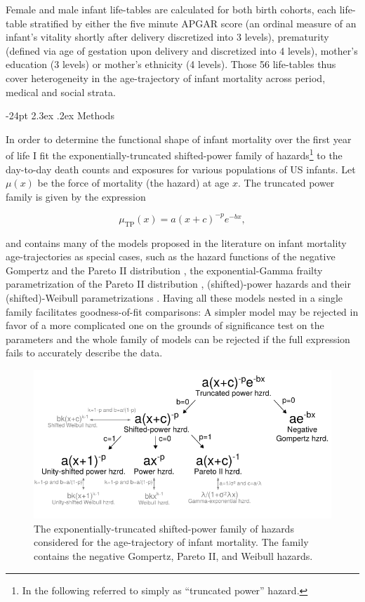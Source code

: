 \documentclass[10pt, twoside, parskip=half]{article}
\makeatletter
\def\maxwidth{\ifdim\Gin@nat@width>\linewidth\linewidth
  \else\Gin@nat@width\fi}
\let\Oldincludegraphics\includegraphics
\renewcommand{\includegraphics}[1]{\Oldincludegraphics[width=\maxwidth]{#1}}
\renewcommand\section{\@startsection {section}{1}{\z@}%
                                   {-24pt}%
                                   {2.3ex \@plus.2ex}%
                                   {\normalfont\large\bfseries}}
\makeatother
\begin{document}
Female and male infant life-tables are calculated for both birth
cohorts, each life-table stratified by either the five minute APGAR
score (an ordinal measure of an infant's vitality shortly after delivery
discretized into 3 levels), prematurity (defined via age of gestation
upon delivery and discretized into 4 levels), mother's education (3
levels) or mother's ethnicity (4 levels). Those 56 life-tables thus
cover heterogeneity in the age-trajectory of infant mortality across
period, medical and social strata.

\section{Methods}\label{methods}

In order to determine the functional shape of infant mortality over the
first year of life I fit the exponentially-truncated shifted-power
family of hazards\footnote{In the following referred to simply as
  ``truncated power'' hazard.} to the day-to-day death counts and
exposures for various populations of US infants. Let \(\mu(x)\) be the
force of mortality (the hazard) at age \(x\). The truncated power family
is given by the expression

\[
\mu_\text{TP}(x) = a(x+c)^{-p}e^{-bx},
\]

and contains many of the models proposed in the literature on infant
mortality age-trajectories as special cases, such as the hazard
functions of the negative Gompertz
\citep[pp.~368]{Lomax1954, Marshall2007} and the Pareto II distribution
\citep[pp.~400]{Lomax1954, Marshall2007}, the exponential-Gamma frailty
parametrization of the Pareto II distribution
\citep[p.~78]{Clayton1985, Wienke2011}, (shifted)-power hazards and
their (shifted)-Weibull parametrizations \citep[pp.~321, see Figure
\ref{fig:plot-models}]{Lehman1963, Marshall2007}. Having all these
models nested in a single family facilitates goodness-of-fit
comparisons: A simpler model may be rejected in favor of a more
complicated one on the grounds of significance test on the parameters
and the whole family of models can be rejected if the full expression
fails to accurately describe the data.

\begin{figure}
\centering
\includegraphics{fig/figure1.pdf}
\caption{\label{fig:plot-models}The exponentially-truncated shifted-power
family of hazards considered for the age-trajectory of infant mortality.
The family contains the negative Gompertz, Pareto II, and Weibull
hazards.}
\end{figure}
\end{document}
